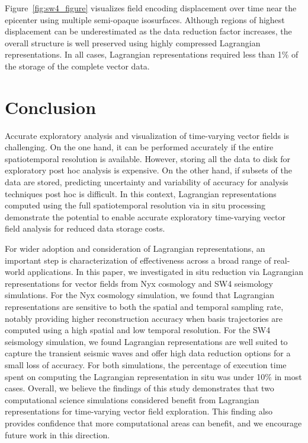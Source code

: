 \documentclass[runningheads]{llncs}
\begin{document}
Figure~\ref{fig:sw4_figure} visualizes field encoding displacement over time near the epicenter using multiple semi-opaque isosurfaces.
%
Although regions of highest displacement can be underestimated as the data reduction factor increases, the overall structure is well preserved using highly compressed Lagrangian representations.
%
In all cases, Lagrangian representations required less than 1\% of the storage of the complete vector data.

\vspace{-2mm}
\section{Conclusion}
\label{sec:conclusion}
Accurate exploratory analysis and visualization of time-varying vector fields is challenging.
% 
On the one hand, it can be performed accurately if the entire spatiotemporal resolution is available.
%
However, storing all the data to disk for exploratory post hoc analysis is expensive.
%
On the other hand, if subsets of the data are stored, predicting uncertainty and variability of accuracy for analysis techniques post hoc is difficult.
%
In this context, Lagrangian representations computed using the full spatiotemporal resolution via in situ processing demonstrate the potential to enable accurate exploratory time-varying vector field analysis for reduced data storage costs.



For wider adoption and consideration of Lagrangian representations, an important step is characterization of effectiveness across a broad range of real-world applications.
%
In this paper, we investigated in situ reduction via Lagrangian representations for vector fields from Nyx cosmology and SW4 seismology simulations.
%
For the Nyx cosmology simulation, we found that Lagrangian representations are sensitive to both the spatial and temporal sampling rate, notably providing higher reconstruction accuracy when basis trajectories are computed using a high spatial and low temporal resolution.
%
For the SW4 seismology simulation, we found Lagrangian representations are well suited to capture the transient seismic waves and offer high data reduction options for a small loss of accuracy.
%
For both simulations, the percentage of execution time spent on computing the Lagrangian representation in situ was under 10\% in most cases.
%
Overall, we believe the findings of this study demonstrates that two computational science simulations considered benefit from Lagrangian representations for time-varying vector field exploration.
%
This finding also provides confidence that more computational areas can benefit, and we encourage future work in this direction.
\end{document}
